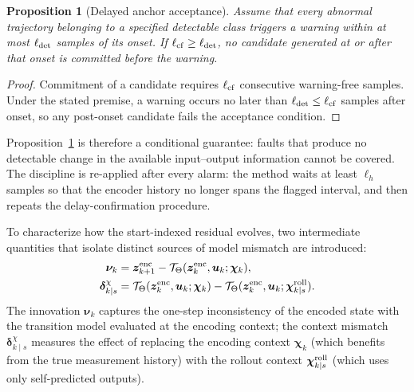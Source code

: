 \documentclass[journal]{IEEEtran}
\newtheorem{proposition}{Proposition}
\newcommand{\1}{\bm 1}
\begin{document}
\begin{proposition}[Delayed anchor acceptance]
\label{prop:anchor}
Assume that every abnormal trajectory belonging to a specified detectable
class triggers a warning within at most $\ell_{\rm det}$ samples of its onset.
If $\ell_{\rm cf}\geq\ell_{\rm det}$, no candidate generated at or after that
onset is committed before the warning.
\end{proposition}

\begin{proof}
Commitment of a candidate requires $\ell_{\rm cf}$ consecutive warning-free
samples. Under the stated premise, a warning occurs no later than $\ell_{\rm
det}\leq\ell_{\rm cf}$ samples after onset, so any post-onset candidate fails
the acceptance condition.
\end{proof}

Proposition~\ref{prop:anchor} is therefore a conditional guarantee: faults
that produce no detectable change in the available input--output information
cannot be covered. The discipline is re-applied after every alarm: the method
waits at least $\ell_h$ samples so that the encoder history no longer spans
the flagged interval, and then repeats the delay-confirmation procedure.

To characterize how the start-indexed residual evolves, two intermediate
quantities that isolate distinct sources of model mismatch are introduced:
\begin{equation}
\begin{aligned}
\bm\nu_k
&=\bm z_{k+1}^{\rm enc}
-\mathcal T_\Theta(\bm z_k^{\rm enc},\bm u_k;\bm\chi_k),\\
\bm\delta_{k\mid s}^{\chi}
&=\mathcal T_\Theta(\bm z_k^{\rm enc},\bm u_k;\bm\chi_k)
-\mathcal T_\Theta(\bm z_k^{\rm enc},\bm u_k;
\bm\chi_{k\mid s}^{\rm roll}).
\end{aligned}
\label{eq:innovation_context}
\end{equation}
The innovation $\bm\nu_k$ captures the one-step inconsistency of the encoded
state with the transition model evaluated at the encoding context; the context
mismatch $\bm\delta_{k\mid s}^{\chi}$ measures the effect of replacing the
encoding context $\bm\chi_k$ (which benefits from the true measurement
history) with the rollout context $\bm\chi_{k\mid s}^{\rm roll}$ (which uses
only self-predicted outputs).
\end{document}
